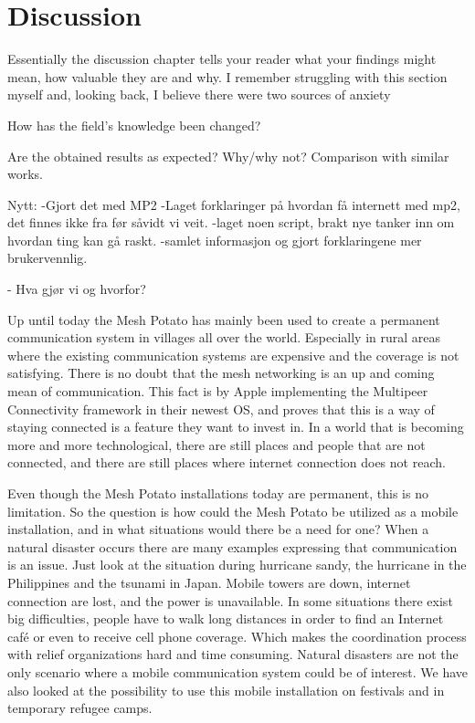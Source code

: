 \chapter{Discussion}
\label{chp:discussion} 

Essentially the discussion chapter tells your reader what your findings might mean, how valuable they are and why. I remember struggling with this section myself and, looking back, I believe there were two sources of anxiety

How has the field's knowledge been changed?

Are the obtained results as expected? Why/why not?
Comparison with similar works. 

Nytt:
-Gjort det med MP2
-Laget forklaringer på hvordan få internett med mp2, det finnes ikke fra før såvidt vi veit. 
-laget noen script, brakt nye tanker inn om hvordan ting kan gå raskt. 
-samlet informasjon og gjort forklaringene mer brukervennlig.

- Hva gjør vi og hvorfor?

Up until today the Mesh Potato has mainly been used to create a permanent communication system in villages all over the world. Especially in rural areas where the existing communication systems are expensive and the coverage is not satisfying. There is no doubt that the mesh networking is an up and coming mean of communication. This fact is  by Apple implementing the Multipeer Connectivity framework in their newest OS, and proves that this is a way of staying connected is a feature they want to invest in. In a world that is becoming more and more technological, there are still places and people that are not connected, and there are still places where internet connection does not reach. 

Even though the Mesh Potato installations today are permanent, this is no limitation. So the question is how could the Mesh Potato be utilized as a mobile installation, and in what situations would there be a need for one? When a natural disaster occurs there are many examples expressing that communication is an issue. Just look at the situation during hurricane sandy, the hurricane in the Philippines and the tsunami in Japan. Mobile towers are down, internet connection are lost, and the power is unavailable. In some situations there exist big difficulties, people have to walk long distances in order to find an Internet café or even to receive cell phone coverage. Which makes the coordination process with relief organizations hard and time consuming. Natural disasters are not the only scenario where a mobile communication system could be of interest. We have also looked at the possibility to use this mobile installation on festivals and in temporary refugee camps. 

